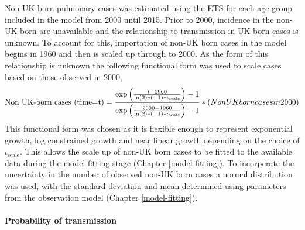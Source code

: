 \documentclass[11pt,twoside]{bristolthesis}
\begin{document}
  Non-UK born pulmonary cases was estimated using the ETS for each age-group included in the model from 2000 until 2015. Prior to 2000, incidence in the non-UK born are unavailable and the relationship to transmission in UK-born cases is unknown. To account for this, importation of non-UK born cases in the model begins in 1960 and then is scaled up through to 2000. As the form of this relationship is unknown the following functional form was used to scale cases based on those observed in 2000,
  \begin{equation}
  \text{Non UK-born cases (time=t)} = \frac{\text{exp}\left(\frac{t - 1960}{\text{ln}(2) * (-1) * \iota_{\text{scale}}}\right) - 1}{\text{exp}\left(\frac{2000 - 1960}{\text{ln}(2) * (-1) * \iota_{\text{scale}}}\right) - 1} * \text(Non UK born cases in 2000)
    \label{eq:non-uk-born-scale}
  \end{equation}
  This functional form was chosen as it is flexible enough to represent exponential growth, log constrained growth and near linear growth depending on the choice of \(\iota_{\text{scale}}\). This allows the scale up of non-UK born cases to be fitted to the available data during the model fitting stage (Chapter \ref{model-fitting}). To incorperate the uncertainty in the number of observed non-UK born cases a normal distribution was used, with the standard deviation and mean determined using parameters from the observation model (Chapter \ref{model-fitting}).
  
  \hypertarget{probability-of-transmission}{%
  \paragraph{Probability of transmission}\label{probability-of-transmission}}
  
\end{document}
